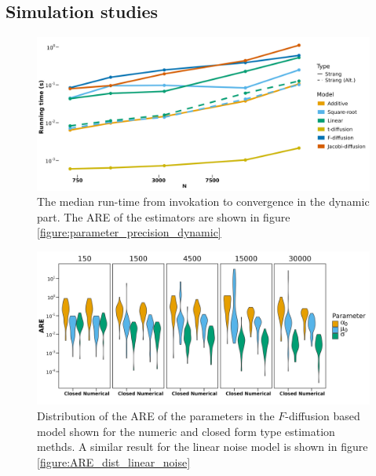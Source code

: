 \subsection{Simulation studies}
\begin{figure}[h!]
    \begin{center}
    \includegraphics[scale = .1]{figures/estimation_duration_dynamic.jpeg}
    \caption{The median run-time from invokation to convergence in the dynamic part. The ARE of the estimators are shown in figure \ref{figure:parameter_precision_dynamic}}
    \label{figure:estimation_duration_dynamic}
    \end{center}
\end{figure}

\begin{figure}[h!]
    \begin{center}
    \includegraphics[scale = .1]{figures/ARE_dist_result_plot_F.jpeg}
    \caption{Distribution of the ARE of the parameters in the $F$-diffusion based model shown for the numeric and closed form type estimation methds. A similar result for the linear noise model is shown in figure \ref{figure:ARE_dist_linear_noise}}
    \label{figure:ARE_dist_numeric_F_diffusion}
    \end{center}
\end{figure}

